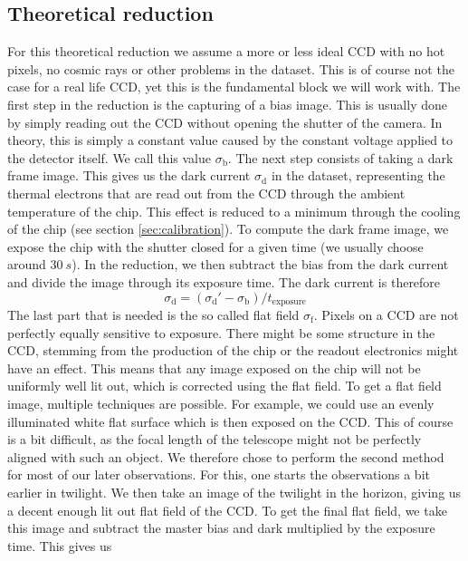 \documentclass{article}
\begin{document}
\subsection{Theoretical reduction}
For this theoretical reduction we assume a more or less ideal CCD with no hot pixels, no cosmic rays or other problems in the dataset. This is of course not the case for a real life CCD, yet this is the fundamental block we will work with.\newline
The first step in the reduction is the capturing of a bias image. This is usually done by simply reading out the CCD without opening the shutter of the camera. In theory, this is simply a constant value caused by the constant voltage applied to the detector itself. We call this value $\sigma_\text{b}$. The next step consists of taking a dark frame image. This gives us the dark current $\sigma_\text{d}$ in the dataset, representing the thermal electrons that are read out from the CCD through the ambient temperature of the chip. This effect is reduced to a minimum through the cooling of the chip (see section \ref{sec:calibration}). To compute the dark frame image, we expose the chip with the shutter closed for a given time (we usually choose around $\SI{30}{s}$). In the reduction, we then subtract the bias from the dark current and divide the image through its exposure time. The dark current is therefore
\begin{equation}
    \sigma_\text{d} = (\sigma_\text{d}' -\sigma_\text{b})/t_\text{exposure}
\end{equation}
The last part that is needed is the so called flat field $\sigma_\text{f}$. Pixels on a CCD are not perfectly equally sensitive to exposure. There might be some structure in the CCD, stemming from the production of the chip or the readout electronics might have an effect. This means that any image exposed on the chip will not be uniformly well lit out, which is corrected using the flat field. To get a flat field image, multiple techniques are possible. For example, we could use an evenly illuminated white flat surface which is then exposed on the CCD. This of course is a bit difficult, as the focal length of the telescope might not be perfectly aligned with such an object. We therefore chose to perform the second method for most of our later observations. For this, one starts the observations a bit earlier in twilight. We then take an image of the twilight in the horizon, giving us a decent enough lit out flat field of the CCD. To get the final flat field, we take this image and subtract the master bias and dark multiplied by the exposure time. This gives us
\end{document}

